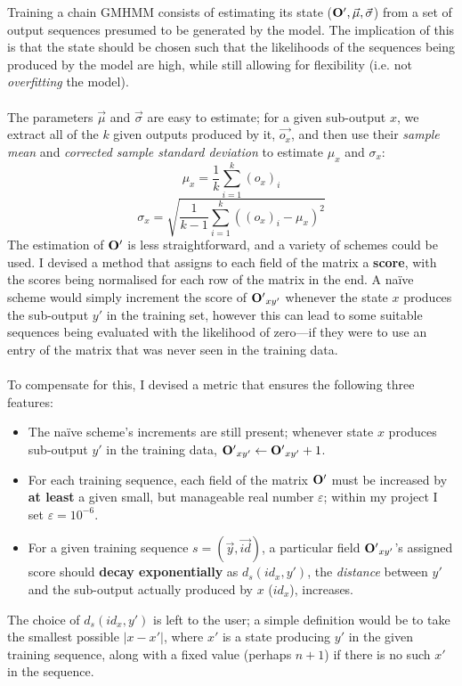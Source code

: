 \documentclass[12pt,a4paper,twoside,openright]{report}
\begin{document}
Training a chain GMHMM consists of estimating its state (${\bf O'}, \vec{\mu}, \vec{\sigma}$) from a set of output sequences presumed to be generated by the model. The implication of this is that the state should be chosen such that the likelihoods of the sequences being produced by the model are high, while still allowing for flexibility (i.e. not \emph{overfitting} the model).\\ \\
The parameters $\vec{\mu}$ and $\vec{\sigma}$ are easy to estimate; for a given sub-output $x$, we extract all of the $k$ given outputs produced by it, $\vec{o_x}$, and then use their \emph{sample mean} and \emph{corrected sample standard deviation} to estimate $\mu_x$ and $\sigma_x$:
\[\mu_x = \frac{1}{k}\sum_{i=1}^{k}{(o_x)_i}\]
\[\sigma_x = \sqrt{\frac{1}{k-1}\sum_{i=1}^{k}{((o_x)_i - \mu_x)^2}}\]
The estimation of ${\bf O'}$ is less straightforward, and a variety of schemes could be used. I devised a method that assigns to each field of the matrix a {\bf score}, with the scores being normalised for each row of the matrix in the end. A na\"ive scheme would simply increment the score of ${\bf O'}_{xy'}$ whenever the state $x$ produces the sub-output $y'$ in the training set, however this can lead to some suitable sequences being evaluated with the likelihood of zero---if they were to use an entry of the matrix that was never seen in the training data.\\ \\
To compensate for this, I devised a metric that ensures the following three features:
\begin{itemize}
	\item The na\"ive scheme's increments are still present; whenever state $x$ produces sub-output $y'$ in the training data, ${\bf O'}_{xy'} \leftarrow {\bf O'}_{xy'} + 1$.
	\item For each training sequence, each field of the matrix ${\bf O'}$ must be increased by {\bf at least} a given small, but manageable real number $\varepsilon$; within my project I set $\varepsilon = 10^{-6}$.
	\item For a given training sequence $s = (\vec{y}, \vec{id})$, a particular field ${\bf O'}_{xy'}$'s assigned score should {\bf decay exponentially} as $d_s(id_x, y')$, the \emph{distance} between $y'$ and the sub-output actually produced by $x$ ($id_x$), increases.
\end{itemize}
The choice of $d_s(id_x, y')$ is left to the user; a simple definition would be to take the smallest possible $|x - x'|$, where $x'$ is a state producing $y'$ in the given training sequence, along with a fixed value (perhaps $n+1$) if there is no such $x'$ in the sequence.\\ \\
\end{document}
